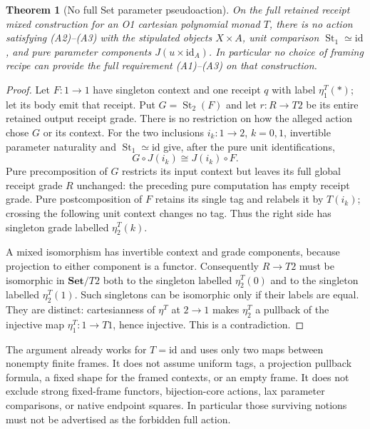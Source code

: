 \documentclass[11pt,a4paper]{article}
\newtheorem{theorem}{Theorem}[section]
\theoremstyle{definition}
\newcommand{\Set}{\mathbf{Set}}
\newcommand{\id}{\mathrm{id}}
\newcommand{\st}{\operatorname{St}}
\begin{document}
\begin{theorem}[No full Set parameter pseudoaction]\label{thm:nogo}
On the full retained receipt mixed construction for an O1 cartesian
polynomial monad $T$, there is no action satisfying
\textup{(A2)--(A3)} with the stipulated objects $X\times A$, unit comparison
$\st_1\simeq\id$, and pure parameter components $J(u\times\id_A)$.
In particular no choice of framing recipe can provide the full requirement
\textup{(A1)--(A3)} on that construction.
\end{theorem}
\begin{proof}
Let $F:1\to1$ have singleton context and one receipt $q$ with label
$\eta^T_1(*)$; let its body emit that receipt. Put $G=\st_2(F)$ and let
$r:R\to T2$ be its entire retained output receipt grade. There is no
restriction on how the alleged action chose $G$ or its context.
For the two inclusions $i_k:1\to2$, $k=0,1$, invertible parameter
naturality and $\st_1\simeq\id$ give, after the pure unit identifications,
\[
 G\circ J(i_k)\cong J(i_k)\circ F.
\]
Pure precomposition of $G$ restricts its input context but leaves its full
global receipt grade $R$ unchanged: the preceding pure computation has
empty receipt grade. Pure postcomposition of $F$ retains its single tag and
relabels it by $T(i_k)$; crossing the following unit context changes no tag.
Thus the right side has singleton grade labelled $\eta^T_2(k)$.

A mixed isomorphism has invertible context and grade components, because
projection to either component is a functor. Consequently $R\to T2$ must
be isomorphic in $\Set/T2$ both to the singleton labelled $\eta^T_2(0)$
and to the singleton labelled $\eta^T_2(1)$. Such singletons can be
isomorphic only if their labels are equal. They are distinct: cartesianness
of $\eta^T$ at $2\to1$ makes $\eta^T_2$ a pullback of the injective map
$\eta^T_1:1\to T1$, hence injective. This is a contradiction.
\end{proof}
The argument already works for $T=\id$ and uses only two maps between
nonempty finite frames. It does not assume uniform tags, a projection
pullback formula, a fixed shape for the framed contexts, or an empty frame.
It does not exclude strong fixed-frame functors, bijection-core actions,
lax parameter comparisons, or native endpoint squares. In particular those
surviving notions must not be advertised as the forbidden full action.
\end{document}
